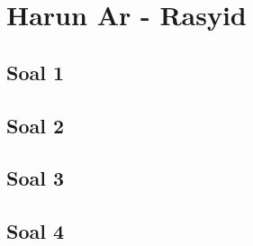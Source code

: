 \section{Harun Ar - Rasyid}
\subsection{Soal 1}
\subsection{Soal 2}
\subsection{Soal 3}
\subsection{Soal 4}